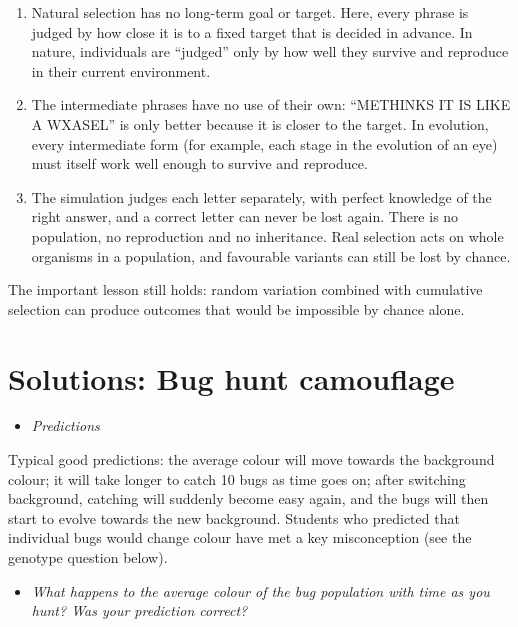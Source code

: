 \documentclass[
  a4paper]{book}
\providecommand{\tightlist}{%
  \setlength{\itemsep}{0pt}\setlength{\parskip}{0pt}}
\begin{document}
\begin{enumerate}
\def\labelenumi{\arabic{enumi}.}
\tightlist
\item
  Natural selection has no long-term goal or target. Here, every phrase is judged by how close it is to a fixed target that is decided in advance. In nature, individuals are ``judged'' only by how well they survive and reproduce in their current environment.
\item
  The intermediate phrases have no use of their own: ``METHINKS IT IS LIKE A WXASEL'' is only better because it is closer to the target. In evolution, every intermediate form (for example, each stage in the evolution of an eye) must itself work well enough to survive and reproduce.
\item
  The simulation judges each letter separately, with perfect knowledge of the right answer, and a correct letter can never be lost again. There is no population, no reproduction and no inheritance. Real selection acts on whole organisms in a population, and favourable variants can still be lost by chance.
\end{enumerate}

The important lesson still holds: random variation combined with cumulative selection can produce outcomes that would be impossible by chance alone.

\section{Solutions: Bug hunt camouflage}\label{solutions-bug-hunt-camouflage}

\begin{itemize}
\tightlist
\item
  \emph{Predictions}
\end{itemize}

Typical good predictions: the average colour will move towards the background colour; it will take longer to catch 10 bugs as time goes on; after switching background, catching will suddenly become easy again, and the bugs will then start to evolve towards the new background. Students who predicted that individual bugs would change colour have met a key misconception (see the genotype question below).

\begin{itemize}
\tightlist
\item
  \emph{What happens to the average colour of the bug population with time as you hunt? Was your prediction correct?}
\end{itemize}
\end{document}
